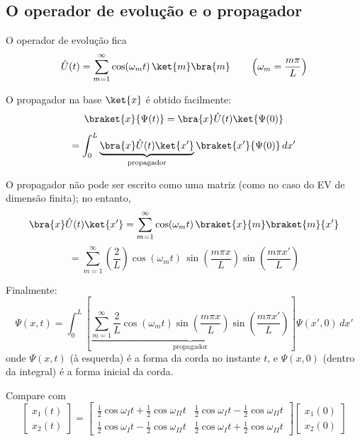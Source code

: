 \subsection*{O operador de evolução e o propagador}

O operador de evolução fica
\begin{equation}
\hat{U}(t) = \sum_{m=1}^{\infty}\cos(\omega_m t)\,\ket{m}\bra{m} \qquad \left(\omega_m = \frac{m\pi}{L}\right)
\label{eq:aula7_operador_evolucao}
\end{equation}

O propagador na base $\ket{x}$ é obtido facilmente:
\begin{equation}
\braket{x}{\Psi(t)} = \bra{x}\hat{U}(t)\ket{\Psi(0)}
\label{eq:aula7_propagador_def}
\end{equation}
\begin{equation}
= \int_0^L \underbrace{\bra{x}\hat{U}(t)\ket{x'}}_{\text{propagador}}\braket{x'}{\Psi(0)}\,dx'
\label{eq:aula7_propagador_integral}
\end{equation}

O propagador não pode ser escrito como uma matriz (como no caso do EV de dimensão finita); no entanto,
\begin{equation}
\bra{x}\hat{U}(t)\ket{x'} = \sum_{m=1}^{\infty}\cos(\omega_m t)\,\braket{x}{m}\braket{m}{x'}
\label{eq:aula7_propagador_soma1}
\end{equation}
\begin{equation}
= \sum_{m=1}^{\infty}\left(\frac{2}{L}\right)\cos(\omega_m t)\,\sin\left(\frac{m\pi x}{L}\right)\sin\left(\frac{m\pi x'}{L}\right)
\label{eq:aula7_propagador_soma2}
\end{equation}

Finalmente:
\begin{equation}
\boxed{\Psi(x,t) = \int_0^L \left[\underbrace{\sum_{m=1}^{\infty}\frac{2}{L}\cos(\omega_m t)\sin\left(\frac{m\pi x}{L}\right)\sin\left(\frac{m\pi x'}{L}\right)}_{\text{propagador}}\right]\Psi(x',0)\,dx'}
\label{eq:aula7_psi_xt_final}
\end{equation}
onde $\Psi(x,t)$ (à esquerda) é a forma da corda no instante $t$, e $\Psi(x,0)$ (dentro da integral) é a forma inicial da corda.

Compare com
\begin{equation}
\begin{bmatrix} x_1(t) \\ x_2(t) \end{bmatrix}
=
\begin{bmatrix}
\tfrac{1}{2}\cos\omega_I t + \tfrac{1}{2}\cos\omega_{II}t & \tfrac{1}{2}\cos\omega_I t - \tfrac{1}{2}\cos\omega_{II}t \\[4pt]
\tfrac{1}{2}\cos\omega_I t - \tfrac{1}{2}\cos\omega_{II}t & \tfrac{1}{2}\cos\omega_I t + \tfrac{1}{2}\cos\omega_{II}t
\end{bmatrix}
\begin{bmatrix} x_1(0) \\ x_2(0) \end{bmatrix}
\label{eq:aula7_comparacao_matriz}
\end{equation}

